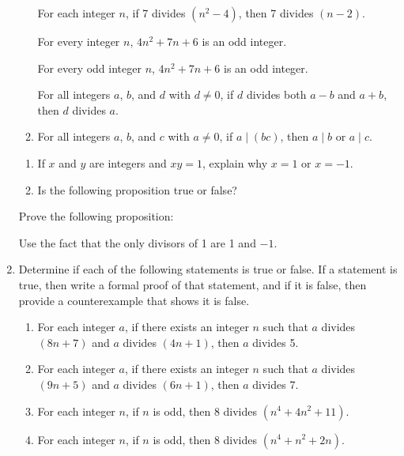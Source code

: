 \begin{enumerate}
\begin{enumerate}
\yitem For each integer $n$, if 7 divides $\left( n^2 - 4 \right)$, then 7 divides $(n - 2)$.

\yitem For every integer $n$, $4n^2 + 7n + 6$ is an odd integer.

\yitem For every odd integer $n$, $4n^2 + 7n + 6$ is an odd integer.

\yitem For all integers $a$, $b$, and  $d$  with $d \ne 0$,  if  $d$   divides both  $a-b$  and  
$a+b$, then  $d$  divides  $a$.

\item For all integers $a$, $b$, and $c$ with $a \ne 0$, if $a \mid (bc)$, then $a \mid b$ or 
$a \mid c$.
\end{enumerate}


\xitem \begin{enumerate} \item If $x$ and $y$ are integers and $ xy=1$, explain why $ x=1$ or 
$ x=-1$.
  \item Is the following proposition true or false?

  \end{enumerate}
  \label{exer:diveach}%




\xitem Prove the following proposition:
\label{exer:sec31-10}%

\hint  Use the fact that the only divisors of 1 are 1 and $-1$.


\item Determine if each of the following statements is true or false.  If a statement is true, then write a formal proof of that statement, and if it is false, then provide a counterexample that shows it is false.
\begin{enumerate}
    \item For each integer $a$, if there exists an integer $n$ such that $a$ divides $(8n + 7)$ and $a$ divides 
$(4n + 1)$, then $a$ divides 5.
  \item For each integer $a$, if there exists an integer $n$ such that $a$ divides $(9n + 5)$ and $a$ divides 
$(6n + 1)$, then $a$ divides 7.
  \item For each integer $n$, if $n$ is odd, then 8 divides $\left( n^4 + 4n^2 + 11 \right)$.
  \item For each integer $n$, if $n$ is odd, then 8 divides $\left( n^4 + n^2 + 2n \right)$.
\end{enumerate}




\end{enumerate}
